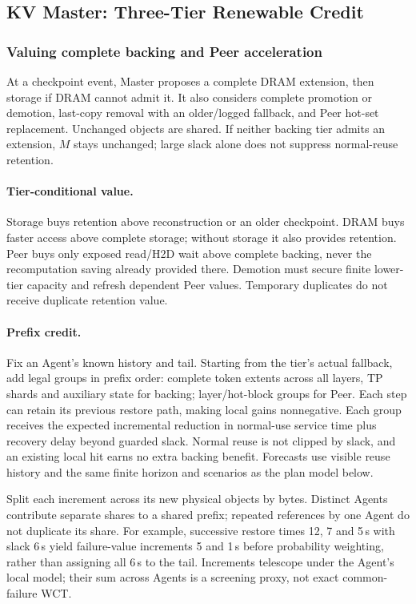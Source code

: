 \subsection{KV Master: Three-Tier Renewable Credit}
\label{sec:kv-master}

\subsubsection{Valuing complete backing and Peer acceleration}
\label{sec:placement-value}

At a checkpoint event, Master proposes a complete DRAM extension, then
storage if DRAM cannot admit it. It also considers complete promotion or
demotion, last-copy removal with an older/logged fallback, and Peer hot-set
replacement. Unchanged objects are shared. If neither backing tier admits
an extension, $M$ stays unchanged; large slack alone does not suppress
normal-reuse retention.

\paragraph{Tier-conditional value.}
Storage buys retention above reconstruction or an older checkpoint.
DRAM buys faster access above complete storage; without storage it also
provides retention. Peer buys only exposed read/H2D wait above complete
backing, never the recomputation saving already provided there. Demotion
must secure finite lower-tier capacity and refresh dependent Peer values.
Temporary duplicates do not receive duplicate retention value.

\paragraph{Prefix credit.}
Fix an Agent's known history and tail. Starting from the tier's actual
fallback, add legal groups in prefix order: complete token extents across
all layers, TP shards and auxiliary state for backing; layer/hot-block
groups for Peer. Each step can retain its previous restore path, making
local gains nonnegative. Each group receives the expected incremental reduction
in normal-use service time plus recovery delay beyond guarded slack.
Normal reuse is not clipped by slack, and an existing local hit earns no
extra backing benefit. Forecasts use visible reuse history and the same
finite horizon and scenarios as the plan model below.

Split each increment across its new physical objects by bytes. Distinct
Agents contribute separate shares to a shared prefix; repeated references
by one Agent do not duplicate its share. For example, successive restore
times 12, 7 and 5\,s with slack 6\,s yield failure-value increments 5 and
1\,s before probability weighting, rather than assigning all 6\,s to the
tail. Increments telescope under the Agent's local model; their sum across
Agents is a screening proxy, not exact common-failure WCT.

